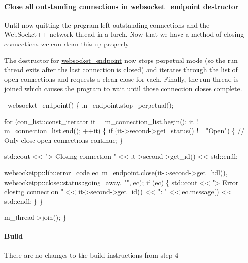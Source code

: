 \paragraph*{Close all outstanding connections in {\ttfamily \hyperlink{classwebsocket__endpoint}{websocket\+\_\+endpoint}} destructor}

Until now quitting the program left outstanding connections and the Web\+Socket++ network thread in a lurch. Now that we have a method of closing connections we can clean this up properly.

The destructor for {\ttfamily \hyperlink{classwebsocket__endpoint}{websocket\+\_\+endpoint}} now stops perpetual mode (so the run thread exits after the last connection is closed) and iterates through the list of open connections and requests a clean close for each. Finally, the run thread is joined which causes the program to wait until those connection closes complete.


\begin{DoxyCode}
~\hyperlink{classwebsocket__endpoint}{websocket\_endpoint}() \{
    m\_endpoint.stop\_perpetual();

    \textcolor{keywordflow}{for} (con\_list::const\_iterator it = m\_connection\_list.begin(); it != m\_connection\_list.end(); ++it) \{
        \textcolor{keywordflow}{if} (it->second->get\_status() != \textcolor{stringliteral}{"Open"}) \{
            \textcolor{comment}{// Only close open connections}
            \textcolor{keywordflow}{continue};
        \}

        std::cout << \textcolor{stringliteral}{"> Closing connection "} << it->second->get\_id() << std::endl;

        websocketpp::lib::error\_code ec;
        m\_endpoint.close(it->second->get\_hdl(), websocketpp::close::status::going\_away, \textcolor{stringliteral}{""}, ec);
        \textcolor{keywordflow}{if} (ec) \{
            std::cout << \textcolor{stringliteral}{"> Error closing connection "} << it->second->get\_id() << \textcolor{stringliteral}{": "}  
                      << ec.message() << std::endl;
        \}
    \}

    m\_thread->join();
\}
\end{DoxyCode}


\paragraph*{Build}

There are no changes to the build instructions from step 4

